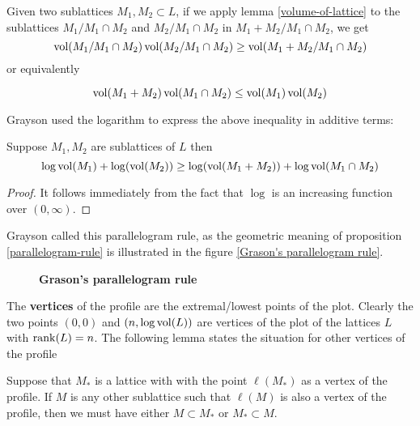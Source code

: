 Given two sublattices $M_1,M_2 \subset L$, if we apply lemma \ref{volume-of-lattice} to the sublattices
$M_1/M_1\cap M_2$ and $M_2/M_1\cap M_2$ in $M_1+M_2/M_1\cap M_2$, we get
\[\operatorname{vol}(M_1/M_1 \cap M_2)\operatorname{vol}(M_2/M_1\cap M_2) \ge \operatorname{vol}(M_1+M_2/M_1\cap M_2)\]
or equivalently
\begin{lemma}
    \[\operatorname{vol}(M_1+M_2)\operatorname{vol}(M_1\cap M_2) \le \operatorname{vol}(M_1)\operatorname{vol}(M_2)\]
\end{lemma}
Grayson used the logarithm to express the above inequality in additive terms:
\begin{prop}\label{parallelogram-rule}
    Suppose $M_1,M_2$ are sublattices of $L$ then
    \[\log\operatorname{vol}(M_1)+\log(\operatorname{vol}(M_2)) \ge \log(\operatorname{vol}(M_1+M_2))+\log\operatorname{vol}(M_1\cap M_2)\]
\end{prop}
\begin{proof}
    It follows immediately from the fact that $\log$ is an increasing function over $(0,\infty)$.
\end{proof}
Grayson called this parallelogram rule, as the geometric meaning of  proposition \ref{parallelogram-rule} is
illustrated in the figure \ref{Grason's parallelogram rule}.
\begin{figure}[hbt!]
    \centering
    \caption{\textbf{Grason's parallelogram  rule}}
    \label{Grason's parallelogram  rule}
\end{figure}
The \textbf{vertices} of the profile are the extremal/lowest points of the plot. Clearly the two points
$(0,0)$ and $(n,\log\operatorname{vol}(L))$ are vertices of the plot of the lattices $L$ with $\operatorname{rank}(L)=n$. The following lemma states the situation for other vertices
of the profile
\begin{lemma}
    Suppose that $M_\ast$ is a lattice with with the point $\ell(M_\ast)$ as a vertex of the profile. If $M$ is any other sublattice such that
    $\ell(M)$ is also a vertex of the profile, then we must have either $M \subset M_\ast$ or $M_\ast \subset M$.
\end{lemma}
